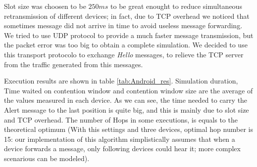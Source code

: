 
Slot size was choosen to be $250ms$ to be great enought to reduce simultaneous retransmission of different devices; in fact, due to TCP overhead we noticed that sometimes message did not arrive in time to avoid useless message forwarding. We tried to use UDP protocol to provide a much faster message transmission, but the packet error was too big to obtain a complete simulation. We decided to use this transport protocolo to exchange \textit{Hello} messages, to relieve the TCP server from the traffic generated from this messages.

Execution results are shown in table \ref{tab:Android_res}. Simulation duration, Time waited on contention window and contention window size are the average of the values measured in each device. As we can see, the time needed to carry the Alert message to the last position is quite big, and this is mainly due to slot size and TCP overhead. The number of Hops in some executions, is equals to the theoretical optimum (With this settings and three devices, optimal hop number is 15: our implementation of this algorithm simplistically assumes that when a device forwards a message, only following devices could hear it; more complex scenarious can be modeled).

